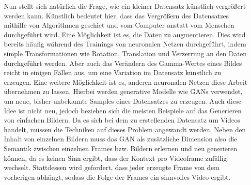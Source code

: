 Nun stellt sich natürlich die Frage, wie ein kleiner Datensatz künstlich
vergrößert werden kann. Künstlich bedeutet hier, dass das Vergrößern des
Datensatzes mithilfe von Algorithmen geschiet und vom Computer anstatt vom
Menschen durchgeführt wird. Eine Möglichkeit ist es, die Daten zu augmentieren.
Dies wird bereits häufig während des Trainings von neuronalen Netzen
durchgeführt, indem simple Transformationen wie Rotation, Translation und
Verzerrung an den Daten durchgeführt werden. Aber auch das Verändern des
Gamma-Wertes eines Bildes reicht in einigen Fällen aus, um eine Variation im
Datensatz künstlich zu erzeugen. Eine weitere Möglichkeit ist es, anderen
neuronalen Netzen diese Arbeit übernehmen zu lassen. Hierbei werden generative
Modelle wie GANs verwendet, um neue, bisher unbekannte Samples eines Datensatzes
zu erzeugen. Auch diese Idee ist nicht neu, jedoch beziehen sich die meisten
Beispiele auf das Generieren von einfachen Bildern. Da es sich bei dem zu
erstellenden Datensatz um Videos handelt, müssen die Techniken auf dieses
Problem angewandt werden. Neben den Inhalt von einzelnen Bildern muss das GAN
als zusätzliche Dimension also die Semantik zwischen einzelnen Frames bzw.
Bildern erlernen und neu generieren können, da es keinen Sinn ergibt, dass der
Kontext pro Videoframe zufällig wechselt. Stattdessen wird gefordert, dass jeder
erzeugte Frame von dem vorherigen abhängt, sodass die Folge der Frames ein
sinnvolles Video ergibt.

